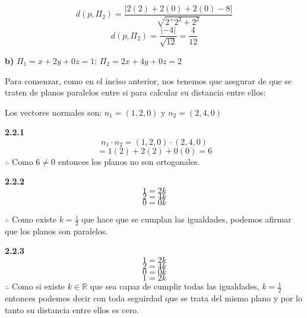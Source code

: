 \documentclass{article}
\begin{document}
$$d(p,\Pi_2) = \frac{\left|2(2)+2(0)+2(0)-8\right|}{\sqrt{2^+2^2+2^2}}$$
$$d(p,\Pi_2) = \frac{\left|-4\right|}{\sqrt{12}} = \frac{4}{12}$$

\vspace{10pt}

\textbf{b)} $\Pi_1= x +2y + 0z =1$; $\Pi_2 = 2x+4y+0z=2$

Para comenzar, como en el inciso anterior, nos tenemos que asegurar de que se traten de planos paralelos entre si para calcular su distancia entre ellos:

Los vectores normales son: $n_1 =(1,2,0)$ y $n_2 = (2, 4,0)$

\textbf{2.2.1}
$$n_1\cdot n_2 = (1,2,0) \cdot (2,4,0)$$
$$= 1(2)+2(2)+0(0) = 6$$
$\therefore$ Como $6\neq 0$ entonces los planos no son ortogonales. 
\vspace{10pt}

\textbf{2.2.2}
$$1 = 2k$$
$$2 = 4k$$
$$0 = 0k$$

$\therefore$ Como existe $k=\frac{1}{2}$ que hace que se cumplan las igualdades, podemos afirmar que los planos son paralelos.
\vspace{10pt}

\textbf{2.2.3}
$$1 = 2k$$
$$2 = 4k$$
$$0 = 0k$$
$$1 = 2k$$
$\therefore$ Como si existe $k \in \mathbb{R}$ que sea capaz de cumplir todas las igualdades, $k=\frac{1}{2}$ entonces podemos decir con toda seguirdad que se trata del mismo plano 
y por lo tanto su distancia entre ellos es cero. 


 
\end{document}
